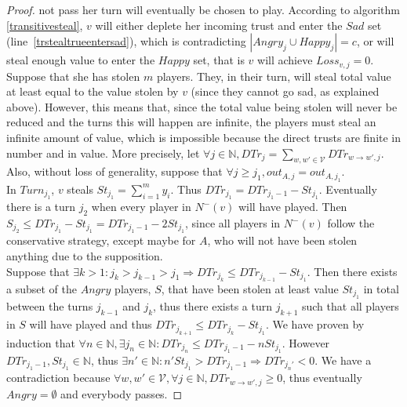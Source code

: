 \documentclass[11pt]{article}
\theoremstyle{definition}
\theoremstyle{corollary}
\theoremstyle{lemma}
\begin{document}
\begin{proof}
       not pass her turn will eventually be chosen to play. According to algorithm \ref{transitivesteal}, $v$ will either
       deplete her incoming trust and enter the $Sad$ set (line~\ref{trstealtrueentersad}), which is contradicting $|Angry_j
       \cup Happy_j| = c$, or will steal enough value to enter the $Happy$ set, that is $v$ will achieve $Loss_{v, j} = 0$.
       Suppose that she has stolen $m$ players. They, in their turn, will steal total value at least equal to the value
       stolen by $v$ (since they cannot go sad, as explained above). However, this means that, since the total value being
       stolen will never be reduced and the turns this will happen are infinite, the players must steal an infinite amount of
       value, which is impossible because the direct trusts are finite in number and in value. More precisely, let $\forall j
       \in \mathbb{N}, DTr_j = \sum\limits_{w,w' \in \mathcal{V}}DTr_{w \rightarrow w', j}$. Also, without loss of
       generality, suppose that $\forall j \geq j_1, out_{A, j} = out_{A, j_1}$. \\ In $Turn_{j_1}$, $v$ steals $St_{j_1} =
       \sum\limits_{i=1}^{m}y_i$. Thus $DTr_{j_1} = DTr_{j_1-1} - St_{j_1}$. Eventually there is a turn $j_2$ when every
       player in $N^{-}(v)$ will have played. Then $S_{j_2} \leq DTr_{j_1} - St_{j_1} = DTr_{j_1-1} - 2St_{j_1}$, since all
       players in $N^{-}(v)$ follow the conservative strategy, except maybe for $A$, who will not have been stolen anything
       due to the supposition. \\
       Suppose that $\exists k > 1 : j_k > j_{k-1} > j_1 \Rightarrow DTr_{j_k} \leq DTr_{j_{k-1}} - St_{j_1}$. Then there
       exists a subset of the $Angry$ players, $S$, that have been stolen at least value $St_{j_1}$ in total between the
       turns $j_{k-1}$ and $j_k$, thus there exists a turn $j_{k+1}$ such that all players in $S$ will have played and thus
       $DTr_{j_{k+1}} \leq DTr_{j_k} - St_{j_1}$. We have proven by induction that $\forall n \in \mathbb{N}, \exists j_n \in
       \mathbb{N} : DTr_{j_n} \leq DTr_{j_1-1} - nSt_{j_1}$. However $DTr_{j_1-1}, St_{j_1} \in \mathbb{N}$, thus $\exists n'
       \in \mathbb{N} : n'St_{j_1} > DTr_{j_1-1} \Rightarrow DTr_{j_n'} < 0$. We have a contradiction because $\forall w,w'
       \in \mathcal{V}, \forall j \in \mathbb{N}, DTr_{w \rightarrow w', j} \geq 0$, thus eventually $Angry = \emptyset$ and
       everybody passes.
    \end{proof}
\end{document}
